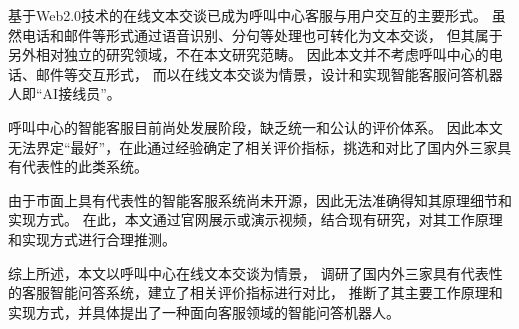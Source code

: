 基于Web2.0技术的在线文本交谈已成为呼叫中心客服与用户交互的主要形式。
虽然电话和邮件等形式通过语音识别、分句等处理也可转化为文本交谈，
但其属于另外相对独立的研究领域，不在本文研究范畴。
因此本文并不考虑呼叫中心的电话、邮件等交互形式，
而以在线文本交谈为情景，设计和实现智能客服问答机器人即“AI接线员”。

呼叫中心的智能客服目前尚处发展阶段，缺乏统一和公认的评价体系。
因此本文无法界定“最好”，在此通过经验确定了相关评价指标，挑选和对比了国内外三家具有代表性的此类系统。

由于市面上具有代表性的智能客服系统尚未开源，因此无法准确得知其原理细节和实现方式。
在此，本文通过官网展示或演示视频，结合现有研究，对其工作原理和实现方式进行合理推测。

综上所述，本文以呼叫中心在线文本交谈为情景，
调研了国内外三家具有代表性的客服智能问答系统，建立了相关评价指标进行对比，
推断了其主要工作原理和实现方式，并具体提出了一种面向客服领域的智能问答机器人。

